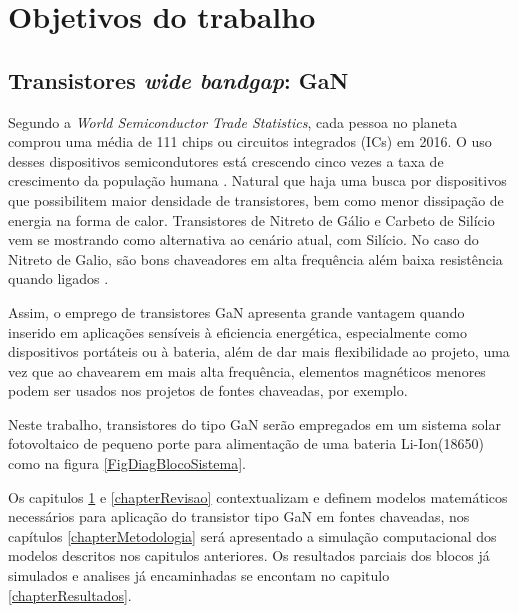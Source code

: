 \chapter{Objetivos do trabalho}
\label{chapterObjetivos}
\section{Transistores \textit{wide bandgap}: GaN}
Segundo a \textit{World Semiconductor Trade Statistics}, cada pessoa no planeta comprou uma média de 111 chips ou circuitos integrados (ICs) em 2016. O uso desses dispositivos semicondutores está crescendo cinco vezes a taxa de crescimento da população humana \cite{Sameer}. Natural que haja uma busca por dispositivos que possibilitem maior densidade de transistores, bem como menor dissipação de energia na forma de calor. Transistores de Nitreto de Gálio e Carbeto de Silício vem se mostrando como alternativa ao cenário atual, com Silício. No caso do Nitreto de Galio, são bons chaveadores em alta frequência além baixa resistência quando ligados \cite{lidow_rooij_strydom_reusch_glaser_2020}. 
\par Assim, o emprego de transistores GaN apresenta grande vantagem quando inserido em aplicações sensíveis à eficiencia energética, especialmente como dispositivos portáteis ou à bateria, além de dar mais flexibilidade ao projeto, uma vez que ao chavearem em mais alta frequência, elementos magnéticos menores podem ser usados nos projetos de fontes chaveadas, por exemplo.  
\par Neste trabalho, transistores do tipo GaN serão empregados em um sistema solar fotovoltaico de pequeno porte para alimentação de uma bateria Li-Ion(18650) como na figura \ref{FigDiagBlocoSistema}.
\par Os capitulos \ref{chapterObjetivos} e \ref{chapterRevisao} contextualizam e definem modelos matemáticos necessários para aplicação do transistor tipo GaN em fontes chaveadas, nos capítulos \ref{chapterMetodologia} será apresentado a simulação computacional dos modelos descritos nos capitulos anteriores. Os resultados parciais dos blocos já simulados e analises já encaminhadas se encontam no capitulo \ref{chapterResultados}.

